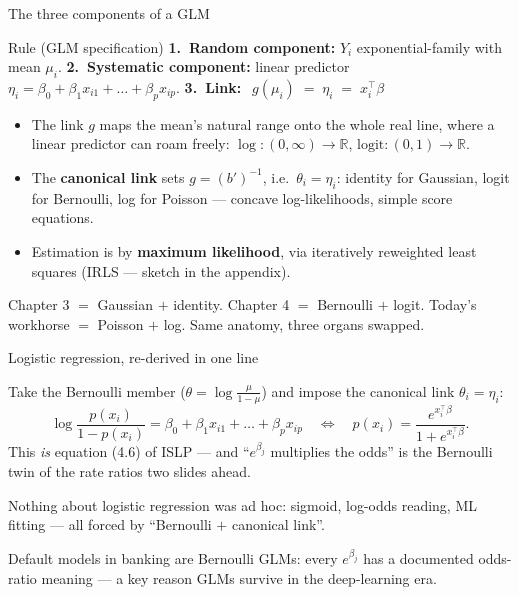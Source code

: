 \documentclass[aspectratio=169,11pt]{beamer}
\begin{document}
\begin{frame}{The three components of a GLM}
  \footnotesize
  \begin{block}{Rule (GLM specification)}
    \footnotesize
    \textbf{1.\ Random component:} $Y_i$ exponential-family with mean $\mu_i$.\quad
    \textbf{2.\ Systematic component:} linear predictor
    $\eta_i = \beta_0 + \beta_1 x_{i1} + \dots + \beta_p x_{ip}$.\quad
    \textbf{3.\ Link:} $\;\boxed{\,g(\mu_i) \;=\; \eta_i \;=\; x_i^{\top}\beta\,}$
  \end{block}
  \begin{readme}
    \begin{itemize}
      \item The link $g$ maps the mean's natural range onto the whole real line, where
            a linear predictor can roam freely: $\log:(0,\infty)\to\mathbb{R}$,
            $\text{logit}:(0,1)\to\mathbb{R}$.
      \item The \textbf{canonical link} sets $g = (b')^{-1}$, i.e.\ $\theta_i = \eta_i$:
            identity for Gaussian, logit for Bernoulli, log for Poisson --- concave
            log-likelihoods, simple score equations.
      \item Estimation is by \textbf{maximum likelihood}, via iteratively reweighted
            least squares (IRLS --- sketch in the appendix).
    \end{itemize}
  \end{readme}
  \begin{takeaway}
    Chapter 3 $=$ Gaussian $+$ identity. Chapter 4 $=$ Bernoulli $+$ logit. Today's
    workhorse $=$ Poisson $+$ log. Same anatomy, three organs swapped.
  \end{takeaway}
\end{frame}

\begin{frame}{Logistic regression, re-derived in one line}
  \footnotesize
  \begin{numexample}
    Take the Bernoulli member ($\theta=\log\frac{\mu}{1-\mu}$) and impose the
    canonical link $\theta_i = \eta_i$:
    \[
      \log\frac{p(x_i)}{1-p(x_i)} = \beta_0 + \beta_1 x_{i1} + \dots + \beta_p x_{ip}
      \quad\Longleftrightarrow\quad
      p(x_i) = \frac{e^{x_i^{\top}\beta}}{1+e^{x_i^{\top}\beta}} .
    \]
    This \emph{is} equation (4.6) of ISLP --- and ``$e^{\beta_j}$ multiplies the
    odds'' is the Bernoulli twin of the rate ratios two slides ahead.
  \end{numexample}
  \begin{takeaway}
    Nothing about logistic regression was ad hoc: sigmoid, log-odds reading, ML
    fitting --- all forced by ``Bernoulli $+$ canonical link''.
  \end{takeaway}
  \begin{industry}
    Default models in banking are Bernoulli GLMs: every $e^{\beta_j}$ has a
    documented odds-ratio meaning --- a key reason GLMs survive in the
    deep-learning era.
  \end{industry}
\end{frame}
\end{document}
